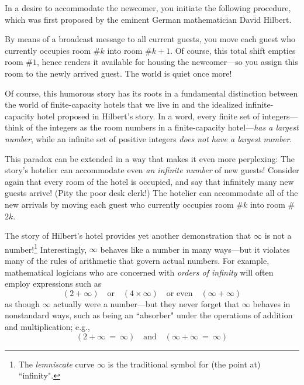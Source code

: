 In a desire to accommodate the newcomer, you initiate the following procedure, which was first proposed by the eminent German mathematician David Hilbert. 

\smallskip

By means of a broadcast message to all current guests, you move each guest who currently occupies room \#$k$ into room \#$k+1$.  Of course, this total shift empties room \#$1$, hence renders it available for housing the newcomer---so you assign this room to the newly arrived guest.  The world is quiet once more!

\smallskip

Of course, this humorous story has its roots in a fundamental distinction between the world of finite-capacity hotels that we live in and the idealized infinite-capacity hotel proposed in Hilbert's story.  In a word, every finite set of integers---think of the integers as the room numbers in a finite-capacity hotel---{\em has a largest number}, while an infinite set of positive integers {\em does not have a largest number}.

\medskip
  
This paradox can be extended in a way that makes it even more  perplexing:  The story's hotelier can accommodate even {\em an infinite number} of new guests!  Consider again that every room 
of the hotel is occupied, and say that infinitely many new guests arrive!  (Pity the poor desk clerk!)  The hotelier can accommodate all of the new arrivals by moving each guest who currently occupies room \#$k$ into room \#$2k$.

\medskip

The story of Hilbert's hotel provides yet another demonstration that $\infty$ is not a number!\footnote{The \textit{lemniscate} curve $\infty$ is the traditional symbol for (the point at) ``infinity".} Interestingly, $\infty$ behaves like a number in many ways---but it violates many of the rules of arithmetic that govern actual numbers.  For example, mathematical logicians who are concerned with {\em orders of infinity} will often employ expressions such as
\[ (2 + \infty)  \ \ \  \mbox{ or } \ \ \ (4 \times \infty) \ \ \
\mbox{ or even } \ \ \ (\infty + \infty) \]
as though $\infty$ actually were a number---but they never forget that $\infty$ behaves in nonstandard ways, such as being an ``absorber" under the operations of addition and multiplication; e.g.,
\[ (2 + \infty \ = \ \infty)  \ \ \  \mbox{ and } \ \ \  (\infty + \infty \ = \ \infty) \]


